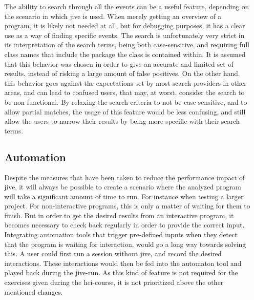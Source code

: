 The ability to search through all the events can be a useful feature, depending on the scenario in which \gls{jive} is used.
When merely getting an overview of a program, it is likely not needed at all, but for debugging purposes, it has a clear use as a way of finding specific events.
The search is unfortunately very strict in its interpretation of the search terms, being both case-sensitive, and requiring full class names that include the package the class is contained within.
It is assumed that this behavior was chosen in order to give an accurate and limited set of results, instead of risking a large amount of false positives.
On the other hand, this behavior goes against the expectations set by most search providers in other areas, and can lead to confused users, that may, at worst, consider the search to be non-functional.
By relaxing the search criteria to not be case sensitive, and to allow partial matches, the usage of this feature would be less confusing, and still allow the users to narrow their results by being more specific with their search-terms.

\subsection{Automation}\label{jiveSuggestionsAutomation}

Despite the measures that have been taken to reduce the performance impact of \gls{jive}, it will always be possible to create a scenario where the analyzed program will take a significant amount of time to run.
For instance when testing a larger project.
For non-interactive programs, this is only a matter of waiting for them to finish.
But in order to get the desired results from an interactive program, it becomes necessary to check back regularly in order to provide the correct input.
Integrating automation tools that trigger pre-defined inputs when they detect that the program is waiting for interaction, would go a long way towards solving this.
A user could first run a session without \gls{jive}, and record the desired interactions.
These interactions would then be fed into the automaton tool and played back during the \gls{jive}-run.
As this kind of feature is not required for the exercises given during the \gls{hci}-course, it is not prioritized above the other mentioned changes.




